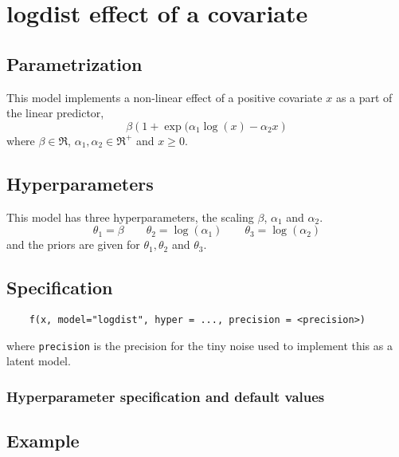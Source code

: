 \documentclass[a4paper,11pt]{article}
\begin{document}
\section*{logdist effect of a covariate}

\subsection*{Parametrization}

This model implements a non-linear effect of a positive covariate $x$
as a part of the linear predictor,
\begin{displaymath}
    \beta \left(1 + \exp(\alpha_1\log(x) - \alpha_2 x\right)
\end{displaymath}
where $\beta\in\Re$, $\alpha_1, \alpha_2 \in \Re^{+}$ and $x\ge 0$.

\subsection*{Hyperparameters}

This model has three hyperparameters, the scaling $\beta$, $\alpha_1$
and $\alpha_2$. 
\begin{displaymath}
    \theta_1 = \beta \qquad \theta_2 = \log(\alpha_1) \qquad  \theta_3 = \log(\alpha_2)
\end{displaymath}
and the priors are given for $\theta_1, \theta_2$ and $\theta_3$.


\subsection*{Specification}

\begin{verbatim}
    f(x, model="logdist", hyper = ..., precision = <precision>)
\end{verbatim}
where \texttt{precision} is the precision for the tiny noise used to
implement this as a latent model. 

\subsubsection*{Hyperparameter specification and default values}


\subsection*{Example}
\end{document}
